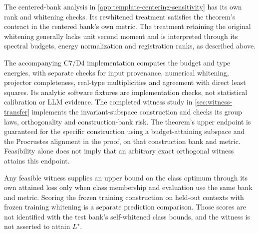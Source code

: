 The centered-bank analysis in \cref{app:template-centering-sensitivity} has its own rank and whitening checks. Its rewhitened treatment satisfies the theorem's contract in the centered bank's own metric. The treatment retaining the original whitening generally lacks unit second moment and is interpreted through its spectral budgets, energy normalization and registration ranks, as described above.

The accompanying C7/D4 implementation computes the budget and type energies, with separate checks for input provenance, numerical whitening, projector completeness, real-type multiplicities and agreement with direct least squares. Its analytic software fixtures are implementation checks, not statistical calibration or LLM evidence. The completed witness study in \cref{sec:witness-transfer} implements the invariant-subspace construction and checks its group laws, orthogonality and construction-bank risk. The theorem's upper endpoint is guaranteed for the specific construction using a budget-attaining subspace and the Procrustes alignment in the proof, on that construction bank and metric. Feasibility alone does not imply that an arbitrary exact orthogonal witness attains this endpoint.

Any feasible witness supplies an upper bound on the class optimum through its own attained loss only when class membership and evaluation use the same bank and metric. Scoring the frozen training construction on held-out contexts with frozen training whitening is a separate prediction comparison. Those scores are not identified with the test bank's self-whitened class bounds, and the witness is not asserted to attain $L^\star$.
